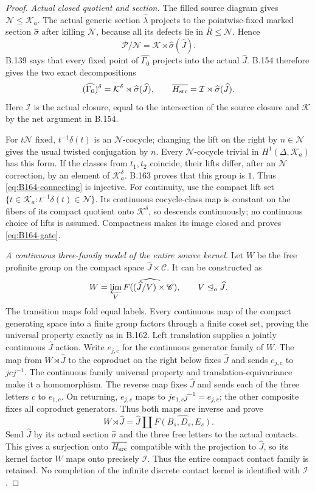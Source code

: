 \begin{proof}
\emph{Actual closed quotient and section.}
The filled source diagram gives $\mathcal N\le\mathcal K_a$.
The actual generic section $\widehat\lambda$ projects to the
pointwise-fixed marked section $\widehat\sigma$ after killing
$\mathcal N$, because all its defects lie in $\overline R\le\mathcal N$.
Hence
\[
 \mathcal P/\mathcal N=\mathcal K\rtimes\widehat\sigma(\widehat J).
\]
B.139 says that every fixed point of $\widehat{\Gamma_0}$ projects
into the actual $\widehat J$. B.154 therefore gives the two exact
decompositions
\[
 (\widehat{\Gamma_0})^\delta
       =\mathcal K^\delta\rtimes\widehat\sigma(\widehat J),\qquad
 \overline{H_{\rm src}}
       =\mathcal I\rtimes\widehat\sigma(\widehat J).
\]
Here $\mathcal I$ is the actual closure, equal to the intersection
of the source closure and $\mathcal K$ by the net argument in B.154.

For $t\mathcal N$ fixed, $t^{-1}\delta(t)$ is an $\mathcal N$-cocycle;
changing the lift on the right by $n\in\mathcal N$ gives the usual
twisted conjugation by $n$. Every $\mathcal N$-cocycle trivial in
$H^1(\Delta,\mathcal K_a)$ has this form. If the classes from $t_1,t_2$
coincide, their lifts differ, after an $\mathcal N$ correction, by an
element of $\mathcal K_a^\delta$. B.163 proves that this group is $1$.
Thus \eqref{eq:B164-connecting} is injective. For continuity, use the
compact lift set $\{t\in\mathcal K_a:t^{-1}\delta(t)\in\mathcal N\}$.
Its continuous cocycle-class map is constant on the fibers of its
compact quotient onto $\mathcal K^\delta$, so descends continuously;
no continuous choice of lifts is assumed. Compactness makes its image
closed and proves \eqref{eq:B164-gate}.

\emph{A continuous three-family model of the entire source kernel.}
Let $W$ be the free profinite group on the compact space
$\widehat J\times\mathscr C$. It can be constructed as
\[
 W=\varprojlim_V\widehat{F((\widehat J/V)\times\mathscr C)},
 \qquad V\trianglelefteq_o\widehat J.
\]
The transition maps fold equal labels. Every continuous map of the
compact generating space into a finite group factors through a finite
coset set, proving the universal property exactly as in B.162.
Left translation supplies a jointly continuous $\widehat J$ action.
Write $e_{j,c}$ for the continuous generator family of $W$.
The map from $W\rtimes\widehat J$ to the coproduct on the right below
fixes $\widehat J$ and sends $e_{j,c}$ to $jcj^{-1}$. The continuous
family universal property and translation-equivariance make it a
homomorphism. The reverse map fixes $\widehat J$ and sends each of
the three letters $c$ to $e_{1,c}$. On returning, $e_{j,c}$ maps to
$j e_{1,c}j^{-1}=e_{j,c}$; the other composite fixes all coproduct
generators. Thus both maps are inverse and prove
\[
 W\rtimes\widehat J
     =\widehat J\amalg\widehat{F(B_s,D_s,E_s)}.
\]
Send $\widehat J$ by its actual section $\widehat\sigma$ and the
three free letters to the actual contacts. This gives a surjection
onto $\overline{H_{\rm src}}$ compatible with the projection to
$\widehat J$, so its kernel factor $W$ maps onto precisely $\mathcal I$.
Thus the entire compact contact family is retained. No completion of
the infinite discrete contact kernel is identified with $\mathcal I$.


\end{proof}
